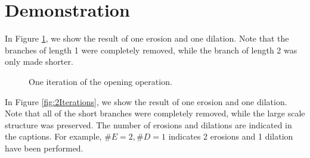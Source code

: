 \documentclass{ComputationalAlgorithmsArticle}
\begin{document}
\section{Demonstration}
\label{sec:Demonstration}
In Figure \ref{fig:1Iteration}, we show the result of one erosion and one dilation. Note that the branches of length 1 were completely removed, while the branch of length 2 was only made shorter.
\begin{figure}[H]
\centering
{}
\caption{One iteration of the opening operation.}
\label{fig:1Iteration}
\end{figure}

In Figure \ref{fig:2Iterations}, we show the result of one erosion and one dilation. Note that all of the short branches were completely removed, while the large scale structure was preserved. The number of erosions and dilations are indicated in the captions. For example, $\#E=2, \#D=1$ indicates 2 erosions and 1 dilation have been performed.
\end{document}
